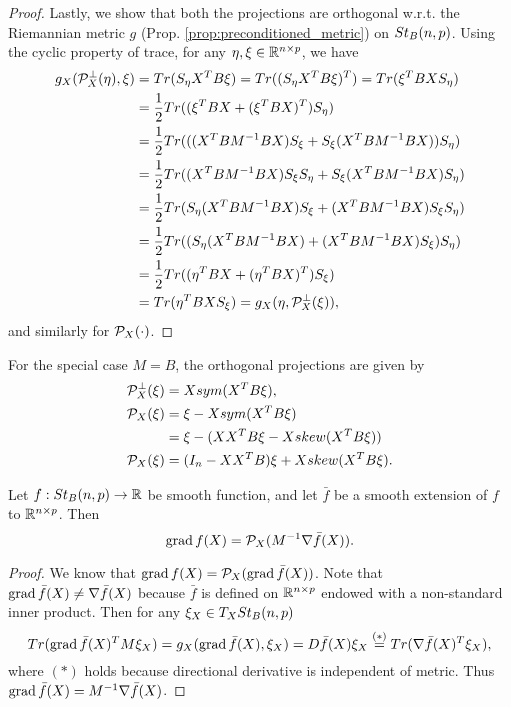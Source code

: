 \documentclass[11pt,a4paper]{article}
\begin{document}
\begin{proof}
Lastly, we show that both the projections are orthogonal w.r.t. the Riemannian metric $g$ (Prop. \ref{prop:preconditioned_metric}) on $St_B(n,p)$. Using the cyclic property of trace, for any $\eta,\xi\in\mathbb{R}^{n\times p}$, we have
\begin{align*}
g_X(\mathcal{P}^\perp_X(\eta),\xi) &= Tr(S_\eta X^T B \xi) = Tr((S_\eta X^T B \xi)^T) = Tr(\xi^T B X S_\eta) \\
&= \frac{1}{2} Tr((\xi^T B X + (\xi^T B X)^T) S_\eta) \\
&= \frac{1}{2} Tr(((X^TBM^{-1}BX)S_\xi + S_\xi(X^TBM^{-1}BX)) S_\eta) \\
&= \frac{1}{2} Tr((X^TBM^{-1}BX)S_\xi S_\eta + S_\xi(X^TBM^{-1}BX) S_\eta) \\
&= \frac{1}{2} Tr(S_\eta(X^TBM^{-1}BX)S_\xi + (X^TBM^{-1}BX)S_\xi S_\eta) \\
&= \frac{1}{2} Tr((S_\eta(X^TBM^{-1}BX) + (X^TBM^{-1}BX)S_\xi )S_\eta) \\
&= \frac{1}{2} Tr((\eta^T B X + (\eta^T B X)^T) S_\xi) \\
&= Tr(\eta^T B X S_\xi) = g_X(\eta,\mathcal{P}^\perp_X(\xi)),
\end{align*}
and similarly for $\mathcal{P}_X(\cdot)$.
\end{proof}

\begin{remark}\label{remark:unpreconditioned_Riemannian_gradient}
For the special case $M = B$, the orthogonal projections are given by
\begin{align*}
\mathcal{P}^\perp_X(\xi) &= Xsym(X^TB\xi),\\
\mathcal{P}_X(\xi) &= \xi - Xsym(X^TB\xi) \nonumber\\
&= \xi - (XX^TB\xi - Xskew(X^TB\xi))\nonumber\\
\mathcal{P}_X(\xi) &= (I_n - XX^TB)\xi + Xskew(X^TB\xi).
\end{align*}
\end{remark}

\begin{prop}
Let $f:St_B(n,p)\rightarrow \mathbb{R}$ be smooth function, and let $\bar{f}$ be a smooth extension of $f$ to $\mathbb{R}^{n\times p}$. Then
\begin{equation}
\text{grad}\, f(X) = \mathcal{P}_X(M^{-1}\nabla \bar{f}(X)).
\end{equation}
\end{prop}

\begin{proof}
We know that $\text{grad}\, f(X) = \mathcal{P}_X(\text{grad}\,\bar{f}(X))$. Note that $\text{grad}\,\bar{f}(X)\neq\nabla\bar{f}(X)$ because $\bar{f}$ is defined on $\mathbb{R}^{n\times p}$ endowed with a non-standard inner product. Then for any $\xi_X\in T_XSt_B(n,p)$
\begin{equation*}
Tr(\text{grad}\,\bar{f}(X)^TM\xi_X) = g_X(\text{grad}\,\bar{f}(X), \xi_X) = D\bar{f}(X)\xi_X \overset{(*)}{=} Tr(\nabla\bar{f}(X)^T\xi_X),
\end{equation*}
where $(*)$ holds because directional derivative is independent of metric. Thus $\text{grad}\,\bar{f}(X) = M^{-1}\nabla\bar{f}(X)$.
\end{proof}
\end{document}
